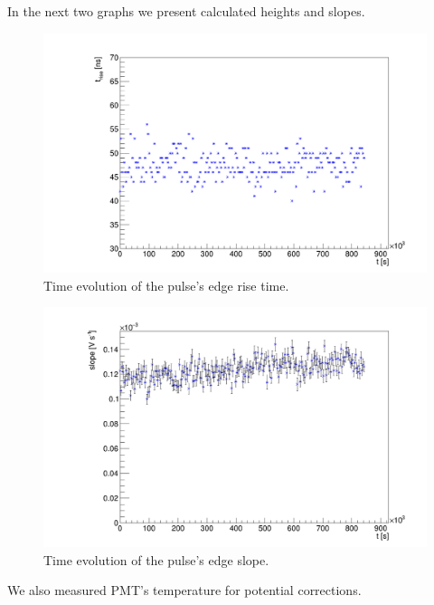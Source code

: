 In the next two graphs we present calculated heights and slopes.

\begin{figure}[H]
 \centering
 \includegraphics[scale=0.3]{./pictures/rise}
 \caption{Time evolution of the pulse's edge rise time.}
 \label{rise1}
\end{figure}

\begin{figure}[H]
 \centering
 \includegraphics[scale=0.3]{./pictures/Slope}
 \caption{Time evolution of the pulse's edge slope.}
 \label{slope1}
\end{figure}

We also measured PMT's temperature for potential corrections.
 
